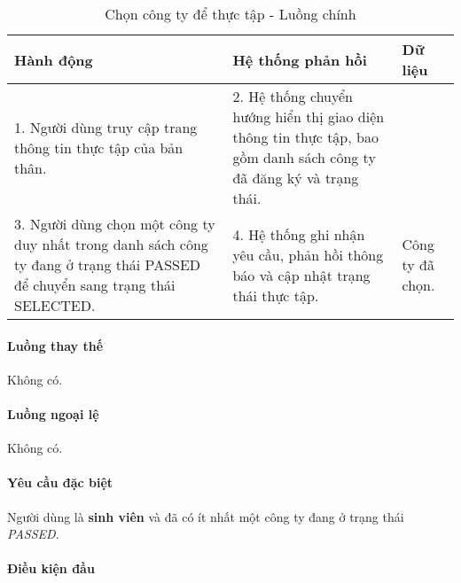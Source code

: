 \documentclass[./../main.tex]{subfiles}
\begin{document}
\begin{table}[H]
	\caption{Chọn công ty để thực tập - Luồng chính}
	\label{tab:select_company}
	\begin{tabularx}{\textwidth}{|X|X|X|}
		\hline
		\textbf{Hành động}                                                                                                           &
		\textbf{Hệ thống phản hồi}                                                                                                   &
		\textbf{Dữ liệu}                                                                                                               \\ \hline
		1. Người dùng truy cập trang thông tin thực tập của bản thân.                                                                &
		2. Hệ thống chuyển hướng hiển thị giao diện thông tin thực tập, bao gồm danh sách công ty đã đăng ký và trạng thái.          &
		\\ \hline
		3. Người dùng chọn một công ty duy nhất trong danh sách công ty đang ở trạng thái PASSED để chuyển sang trạng thái SELECTED. &
		4. Hệ thống ghi nhận yêu cầu, phản hồi thông báo và cập nhật trạng thái thực tập.                                            &
		Công ty đã chọn.                                                                                                               \\ \hline
	\end{tabularx}
\end{table}

\paragraph*{Luồng thay thế} Không có.

\paragraph*{Luồng ngoại lệ} Không có.

\paragraph*{Yêu cầu đặc biệt}

Người dùng là \textbf{sinh viên} và đã có ít nhất một công ty đang ở
trạng thái \emph{PASSED}.

\paragraph*{Điều kiện đầu}
\end{document}

